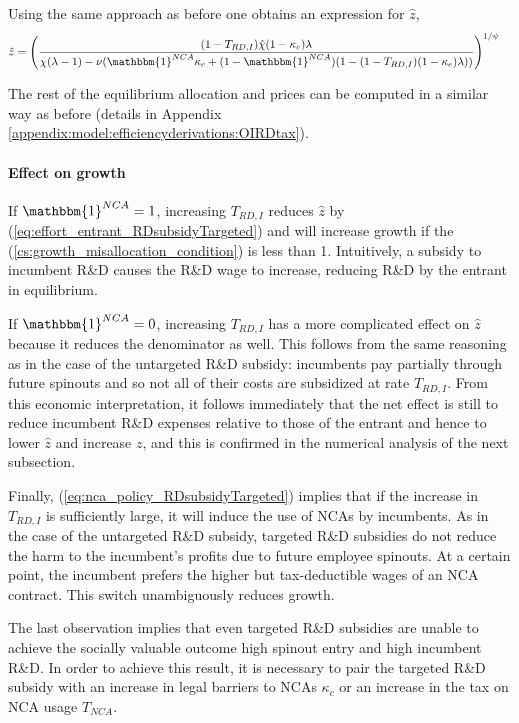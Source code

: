 \documentclass[11pt,english]{article}
\begin{document}
Using the same approach as before one obtains an expression for $\hat{z}$, 
\begin{align}
\hat{z} &= \Bigg( \frac{(1-T_{RD,I})\hat{\chi} (1-\kappa_{e}) \lambda}{\chi(\lambda -1) - \nu (\mathbbm{1}^{NCA} \kappa_c + (1-\mathbbm{1}^{NCA})(1 - (1-T_{RD,I})(1-\kappa_e)\lambda)) } \Bigg)^{1/\psi} \label{eq:effort_entrant_RDsubsidyTargeted}
\end{align}

The rest of the equilibrium allocation and prices can be computed in a similar way as before (details in Appendix \ref{appendix:model:efficiencyderivations:OIRDtax}). 






\paragraph{Effect on growth}

If $\mathbbm{1}^{NCA} = 1$, increasing $T_{RD,I}$ reduces $\hat{z}$ by (\ref{eq:effort_entrant_RDsubsidyTargeted}) and will increase growth if the (\ref{cs:growth_misallocation_condition}) is less than 1. Intuitively, a subsidy to incumbent R\&D causes the R\&D wage to increase, reducing R\&D by the entrant in equilibrium. 

If $\mathbbm{1}^{NCA} = 0$, increasing $T_{RD,I}$ has a more complicated effect on $\hat{z}$ because it reduces the denominator as well. This follows from the same reasoning as in the case of the untargeted R\&D subsidy: incumbents pay partially through future spinouts and so not all of their costs are subsidized at rate $T_{RD,I}$. From this economic interpretation, it follows immediately that the net effect is still to reduce incumbent R\&D expenses relative to those of the entrant and hence to lower $\hat{z}$ and increase $z$, and this is confirmed in the numerical analysis of the next subsection.

Finally, (\ref{eq:nca_policy_RDsubsidyTargeted}) implies that if the increase in $T_{RD,I}$ is sufficiently large, it will induce the use of NCAs by incumbents. As in the case of the untargeted R\&D subsidy, targeted R\&D subsidies do not reduce the harm to the incumbent's profits due to future employee spinouts. At a certain point, the incumbent prefers the higher but tax-deductible wages of an NCA contract. This switch unambiguously reduces growth.

The last observation implies that even targeted R\&D subsidies are unable to achieve the socially valuable outcome high spinout entry and high incumbent R\&D. In order to achieve this result, it is necessary to pair the targeted R\&D subsidy with an increase in legal barriers to NCAs $\kappa_c$ or an increase in the tax on NCA usage $T_{NCA}$. 
\end{document}
